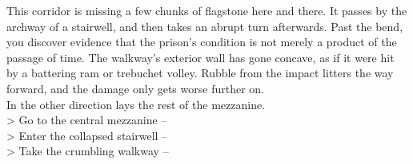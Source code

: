 This corridor is missing a few chunks of flagstone here and there. It passes by the archway of a stairwell, and then takes an abrupt turn afterwards. Past the bend, you discover evidence that the prison’s condition is not merely a product of the passage of time. The walkway's exterior wall has gone concave, as if it were hit by a battering ram or trebuchet volley. Rubble from the impact litters the way forward, and the damage only gets worse further on.\\

In the other direction lays the rest of the mezzanine.\\

> Go to the central mezzanine -- \\
> Enter the collapsed stairwell -- \\
> Take the crumbling walkway -- 